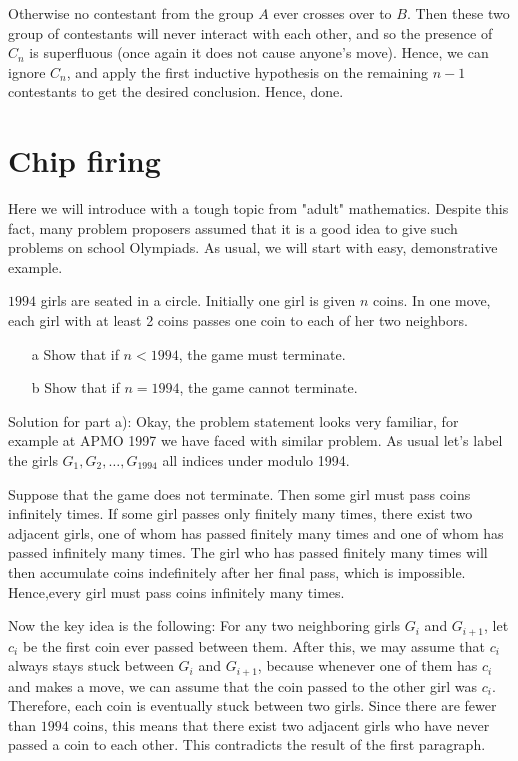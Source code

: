 Otherwise no contestant from the group $A$ ever crosses over to $B$. Then these two group of contestants will never interact with each other, and so the presence of $C_n$ is superfluous (once again it does not cause anyone's move). Hence, we can ignore $C_n$, and apply the first inductive hypothesis on the remaining $n-1$ contestants to get the desired conclusion. Hence, done.

\section{Chip firing}

Here we will introduce with a tough topic from "adult" mathematics. Despite this fact, many problem proposers assumed that it is a good idea to give such problems on school Olympiads. As usual, we will start with easy, demonstrative example. 

\begin{example}[ISL 1994]
    $1994$ girls are seated in a circle. Initially one girl is given $n$ coins. In one move, each girl with at least 2 coins passes one coin to each of her two neighbors. 
    \begin{itemize}
        \item[a] Show that if $n<1994$, the game must terminate.
        \item[b] Show that if $n=1994$, the game cannot terminate.
    \end{itemize}
\end{example}

\sol 

Solution for part a): Okay, the problem statement looks very familiar, for example at APMO 1997 we have faced with similar problem. As usual let's label the girls $G_1, G_2, \dots, G_{1994}$ all indices under modulo 1994.

Suppose that the game does not terminate. Then some girl must pass coins infinitely times. If some girl passes only finitely many times, there exist two adjacent girls, one of whom has passed finitely many times and one of whom has passed infinitely many times. The girl who has passed finitely many times will then accumulate coins indefinitely after her final pass, which is impossible. Hence,every girl must pass coins infinitely many times. 

Now the key idea is the following: For any two neighboring girls $G_i$ and $G_{i+1}$, let $c_i$ be the first coin ever passed between them. After this, we may assume that $c_i$ always stays stuck between $G_i$ and $G_{i+1}$, because whenever one of them has $c_i$ and makes a move, we can assume that the coin passed to the other girl was $c_i$. Therefore, each coin is eventually stuck between two girls. Since there are fewer than $1994$ coins, this means that there exist two adjacent girls who have never passed a coin to each other. This contradicts the result of the first paragraph.

